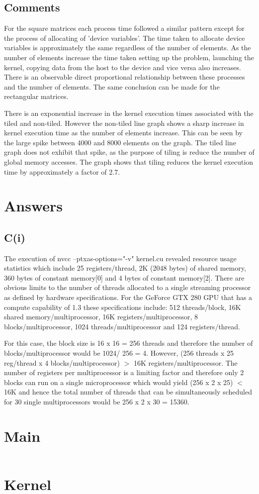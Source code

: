 \documentclass{article}
\begin{document}
\subsection{Comments}
For the square matrices each process time followed a similar pattern except for the process of allocating of 'device variables'. The time taken to allocate device variables is approximately the same regardless of the number of elements.  As the number of elements increase the time taken setting up the problem, launching the kernel, copying data from the host to the device and vice versa also increases. There is an observable direct proportional relationship  between these processes and the number of elements. The same conclusion can be made for the rectangular matrices. 

\setlength{\parindent}{0cm}
\setlength{\parskip}{1em} 
There is an exponential increase in the kernel execution times associated with the tiled and non-tiled. However the non-tiled line graph shows a sharp increase in kernel execution time as the number of elements increase. This can be seen by the large spike between 4000 and 8000 elements on the graph. The tiled line graph does not exhibit that spike, as the purpose of tiling is reduce the number of global memory accesses. The graph shows that tiling reduces the kernel execution time by approximately a factor of 2.7.

\section{Answers}
\subsection{C(i)}   
The execution of nvcc --ptxas-options="-v" kernel.cu revealed resource usage statistics which include 25 registers/thread, 2K (2048 bytes) of shared memory, 360 bytes of constant memory[0] and 4 bytes of constant memory[2]. There are obvious limits to the number of threads allocated to a single streaming processor as defined by hardware specifications. For the GeForce GTX 280 GPU that has a compute capability of 1.3 these specifications include: 512 threads/block, 16K shared memory/multiprocessor, 16K registers/multiprocessor, 8 blocks/multiprocessor, 1024 threads/multiprocessor and 124 registers/thread. 

\setlength{\parindent}{0cm}
\setlength{\parskip}{1em} 
For this case, the block size is 16 x 16 = 256 threads and therefore the number of blocks/multiprocessor would be 1024/ 256 = 4. However, (256 threads x 25 reg/thread x 4 blocks/multiprocessor) $>$ 16K registers/multiprocessor. The number of registers per multiprocessor is a limiting factor and therefore only 2 blocks can run on a single microprocessor which would yield (256 x 2 x 25) $<$ 16K and hence the total number of threads that can be simultaneously scheduled for 30 single multiprocessors would be 256 x 2 x 30 = 15360. 

\section{Main}
\inputminted[breaklines, linenos]{c}{./main.cu}

\section{Kernel}
\inputminted[breaklines, linenos]{c}{./kernel.cu}
\end{document}
